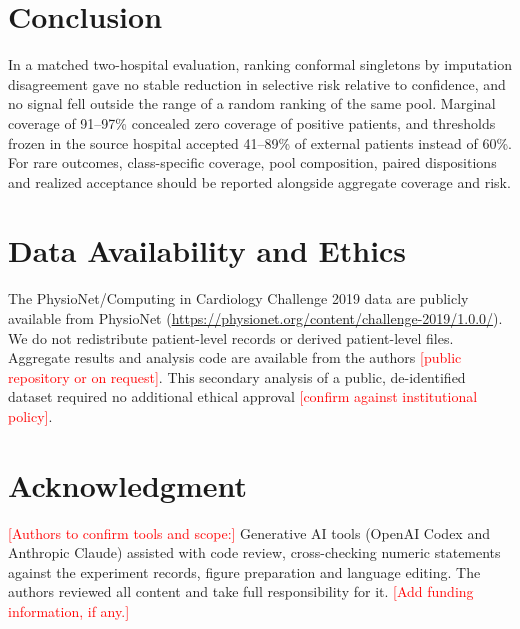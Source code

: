 \documentclass[conference]{IEEEtran}
\newcommand{\confirm}[1]{\textcolor{red}{[#1]}}
\begin{document}
\section{Conclusion}

In a matched two-hospital evaluation, ranking conformal singletons by imputation disagreement gave no stable reduction in selective risk relative to confidence, and no signal fell outside the range of a random ranking of the same pool. Marginal coverage of 91--97\% concealed zero coverage of positive patients, and thresholds frozen in the source hospital accepted 41--89\% of external patients instead of 60\%. For rare outcomes, class-specific coverage, pool composition, paired dispositions and realized acceptance should be reported alongside aggregate coverage and risk.

\section*{Data Availability and Ethics}
The PhysioNet/Computing in Cardiology Challenge 2019 data are publicly available from PhysioNet (\url{https://physionet.org/content/challenge-2019/1.0.0/}). We do not redistribute patient-level records or derived patient-level files. Aggregate results and analysis code are available from the authors \confirm{public repository or on request}. This secondary analysis of a public, de-identified dataset required no additional ethical approval \confirm{confirm against institutional policy}.

\section*{Acknowledgment}
\confirm{Authors to confirm tools and scope:} Generative AI tools (OpenAI Codex and Anthropic Claude) assisted with code review, cross-checking numeric statements against the experiment records, figure preparation and language editing. The authors reviewed all content and take full responsibility for it. \confirm{Add funding information, if any.}


\end{document}
